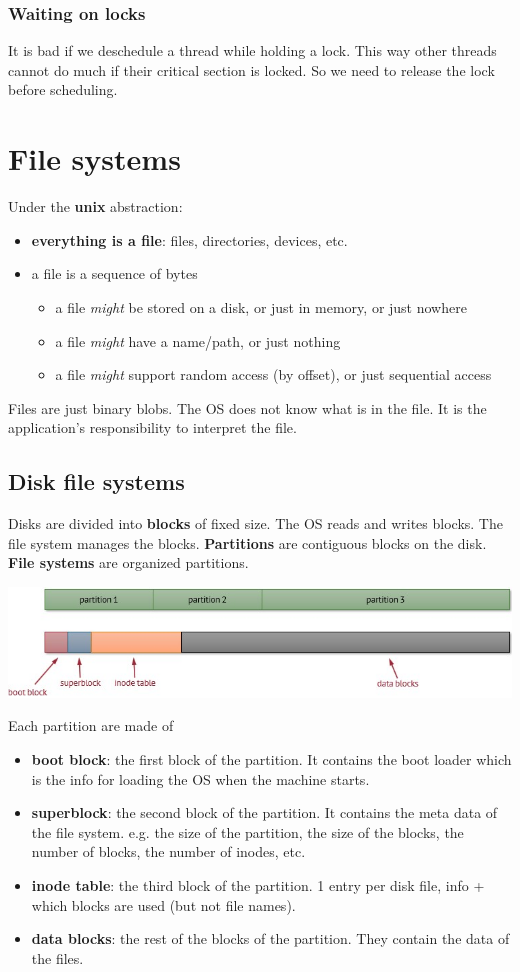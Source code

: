 \documentclass[letterpaper,12pt]{article}
\begin{document}
\subsubsection{Waiting on locks}
It is bad if we deschedule a thread while holding a lock. This way other threads cannot do much if their critical section is locked. So we need to release the lock before scheduling.
\section{File systems}
Under the \textbf{unix} abstraction:\begin{itemize}
    \item \textbf{everything is a file}: files, directories, devices, etc.
    \item a file is a sequence of bytes\begin{itemize}
        \item a file \textit{might} be stored on a disk, or just in memory, or just nowhere
        \item a file \textit{might} have a name/path, or just nothing
        \item a file \textit{might} support random access (by offset), or just sequential access
    \end{itemize}
\end{itemize}
Files are just binary blobs. The OS does not know what is in the file. It is the application's responsibility to interpret the file.
\subsection{Disk file systems}
Disks are divided into \textbf{blocks} of fixed size. The OS reads and writes blocks. The file system manages the blocks. \textbf{Partitions} are contiguous blocks on the disk. \textbf{File systems} are organized partitions.

\includegraphics*[scale = 0.7]{./Images/Disck partitions.jpg}

Each partition are made of \begin{itemize}
    \item \textbf{boot block}: the first block of the partition. It contains the boot loader which is the info for loading the OS when the machine starts.
    \item \textbf{superblock}: the second block of the partition. It contains the meta data of the file system. e.g. the size of the partition, the size of the blocks, the number of blocks, the number of inodes, etc.
    \item \textbf{inode table}: the third block of the partition. 1 entry per disk file, info + which blocks are used (but not file names).
    \item \textbf{data blocks}: the rest of the blocks of the partition. They contain the data of the files.
\end{itemize}
\end{document}

